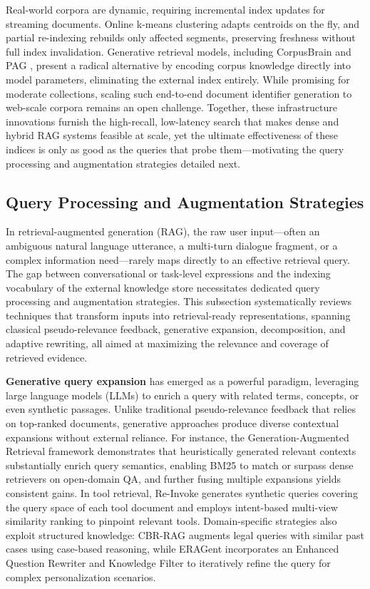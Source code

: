 \documentclass[11pt,a4paper]{article}
\begin{document}
Real-world corpora are dynamic, requiring incremental index updates for streaming documents. Online k-means clustering adapts centroids on the fly, and partial re-indexing rebuilds only affected segments, preserving freshness without full index invalidation. Generative retrieval models, including CorpusBrain \cite{arxiv:2402.16767v1} and PAG \cite{arxiv:2404.14600v1}, present a radical alternative by encoding corpus knowledge directly into model parameters, eliminating the external index entirely. While promising for moderate collections, scaling such end-to-end document identifier generation to web-scale corpora remains an open challenge. Together, these infrastructure innovations furnish the high-recall, low-latency search that makes dense and hybrid RAG systems feasible at scale, yet the ultimate effectiveness of these indices is only as good as the queries that probe them---motivating the query processing and augmentation strategies detailed next.


\subsection{Query Processing and Augmentation Strategies}


In retrieval-augmented generation (RAG), the raw user input---often an ambiguous natural language utterance, a multi-turn dialogue fragment, or a complex information need---rarely maps directly to an effective retrieval query. The gap between conversational or task-level expressions and the indexing vocabulary of the external knowledge store necessitates dedicated query processing and augmentation strategies. This subsection systematically reviews techniques that transform inputs into retrieval-ready representations, spanning classical pseudo-relevance feedback, generative expansion, decomposition, and adaptive rewriting, all aimed at maximizing the relevance and coverage of retrieved evidence.

\textbf{Generative query expansion} has emerged as a powerful paradigm, leveraging large language models (LLMs) to enrich a query with related terms, concepts, or even synthetic passages. Unlike traditional pseudo-relevance feedback that relies on top-ranked documents, generative approaches produce diverse contextual expansions without external reliance. For instance, the Generation-Augmented Retrieval \cite{arxiv:2009.08553v4} framework demonstrates that heuristically generated relevant contexts substantially enrich query semantics, enabling BM25 to match or surpass dense retrievers on open-domain QA, and further fusing multiple expansions yields consistent gains. In tool retrieval, Re-Invoke \cite{arxiv:2408.01875v2} generates synthetic queries covering the query space of each tool document and employs intent-based multi-view similarity ranking to pinpoint relevant tools. Domain-specific strategies also exploit structured knowledge: CBR-RAG \cite{arxiv:2404.04302v1} augments legal queries with similar past cases using case-based reasoning, while ERAGent \cite{arxiv:2405.06683v1} incorporates an Enhanced Question Rewriter and Knowledge Filter to iteratively refine the query for complex personalization scenarios.
\end{document}
